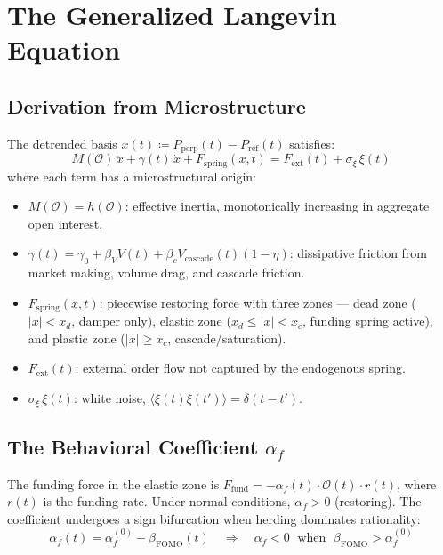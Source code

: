 \documentclass[11pt,a4paper]{article}
\newcommand{\af}{\alpha_f}
\newcommand{\OI}{\mathcal{O}}
\newcommand{\Fext}{F_{\mathrm{ext}}}
\newcommand{\Fspring}{F_{\mathrm{spring}}}
\newcommand{\Ffund}{F_{\mathrm{fund}}}
\begin{document}
\section{The Generalized Langevin Equation}
\label{sec:langevin}

\subsection{Derivation from Microstructure}

The detrended basis $x(t) \coloneqq P_{\mathrm{perp}}(t) - P_{\mathrm{ref}}(t)$ satisfies:
\begin{equation}
\boxed{M(\OI)\,\ddot{x} + \gamma(t)\,\dot{x} + \Fspring(x,t) = \Fext(t) + \sigma_\xi\,\xi(t)}
\label{eq:langevin}
\end{equation}
where each term has a microstructural origin:
\begin{itemize}[leftmargin=1.5em]
\item $M(\OI) = h(\OI)$: effective inertia, monotonically increasing in aggregate open interest.
\item $\gamma(t) = \gamma_0 + \beta_V V(t) + \beta_c V_{\text{cascade}}(t)(1-\eta)$: dissipative friction from market making, volume drag, and cascade friction.
\item $\Fspring(x,t)$: piecewise restoring force with three zones --- dead zone ($|x| < x_d$, damper only), elastic zone ($x_d \leq |x| < x_c$, funding spring active), and plastic zone ($|x| \geq x_c$, cascade/saturation).
\item $\Fext(t)$: external order flow not captured by the endogenous spring.
\item $\sigma_\xi\,\xi(t)$: white noise, $\langle\xi(t)\xi(t')\rangle = \delta(t-t')$.
\end{itemize}

\subsection{The Behavioral Coefficient $\af$}

The funding force in the elastic zone is $\Ffund = -\af(t)\cdot\OI(t)\cdot r(t)$, where $r(t)$ is the funding rate. Under normal conditions, $\af > 0$ (restoring). The coefficient undergoes a sign bifurcation when herding dominates rationality:
\begin{equation}
\af(t) = \af^{(0)} - \beta_{\text{FOMO}}(t) \quad\Longrightarrow\quad \af < 0 \;\text{ when }\; \beta_{\text{FOMO}} > \af^{(0)}
\end{equation}
\end{document}

